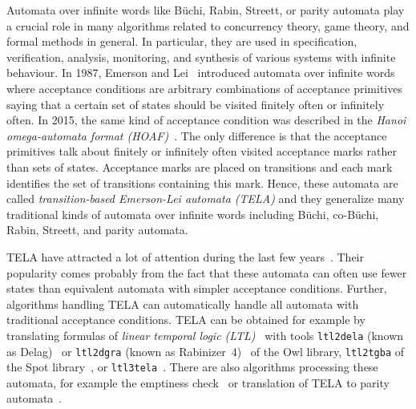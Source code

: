 \documentclass[a4paper,UKenglish,cleveref,autoref,thm-restate]{lipics-v2021}
\begin{document}

Automata over infinite words like Büchi, Rabin, Streett, or parity
automata play a crucial role in many algorithms related to 
concurrency theory, game theory, and formal methods in general. In
particular, they are used in specification, verification, analysis,
monitoring, and synthesis of various systems with infinite
behaviour. In 1987, Emerson and Lei~\cite{emerson.87.scp} introduced
automata over infinite words where acceptance conditions are arbitrary
combinations of acceptance primitives saying that a certain set of
states should be visited finitely often or infinitely often. In 2015,
the same kind of acceptance condition was described in the \emph{Hanoi
  omega-automata format (HOAF)}~\cite{babiak.15.cav}. The only
difference is that the acceptance primitives talk about finitely or
infinitely often visited acceptance marks rather than sets of states.
Acceptance marks are placed on transitions and each mark identifies
the set of transitions containing this mark. Hence, these automata are
called \emph{transition-based Emerson-Lei automata (TELA)} and they
generalize many traditional kinds of automata over infinite words
including Büchi, co-Büchi, Rabin, Streett, and parity automata.

TELA have attracted a lot of attention during the last few
years~\cite{baier.19.atva,major.19.atva,muller.17.gandalf,renkin.20.atva}.
Their popularity comes probably from the fact that these automata can
often use fewer states than equivalent automata with simpler
acceptance conditions. Further, algorithms handling TELA can
automatically handle all automata with traditional acceptance
conditions. TELA can be obtained for example by translating formulas
of \emph{linear temporal logic (LTL)}~\cite{pnueli.77.focs} with tools
\texttt{ltl2dela} (known as Delag)~\cite{muller.17.gandalf} or
\texttt{ltl2dgra} (known as Rabinizer~4)~\cite{kretinsky.18.cav} of
the Owl library, \texttt{ltl2tgba} of the Spot
library~\cite{duret.16.atva2}, or
\texttt{ltl3tela}~\cite{major.19.atva}. There are also algorithms
processing these automata, for example the emptiness
check~\cite{baier.19.atva} or translation of TELA to parity
automata~\cite{renkin.20.atva,casares.22.tacas}.
\end{document}
